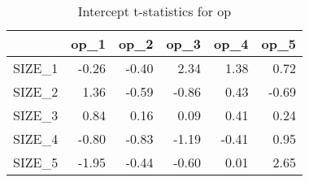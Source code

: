 \begin{table}[ht]
\centering
\caption{Intercept t-statistics for op} 
\begin{tabular}{rrrrrr}
  \hline
 & op\_1 & op\_2 & op\_3 & op\_4 & op\_5 \\ 
  \hline
SIZE\_1 & -0.26 & -0.40 & 2.34 & 1.38 & 0.72 \\ 
  SIZE\_2 & 1.36 & -0.59 & -0.86 & 0.43 & -0.69 \\ 
  SIZE\_3 & 0.84 & 0.16 & 0.09 & 0.41 & 0.24 \\ 
  SIZE\_4 & -0.80 & -0.83 & -1.19 & -0.41 & 0.95 \\ 
  SIZE\_5 & -1.95 & -0.44 & -0.60 & 0.01 & 2.65 \\ 
   \hline
\end{tabular}
\end{table}


